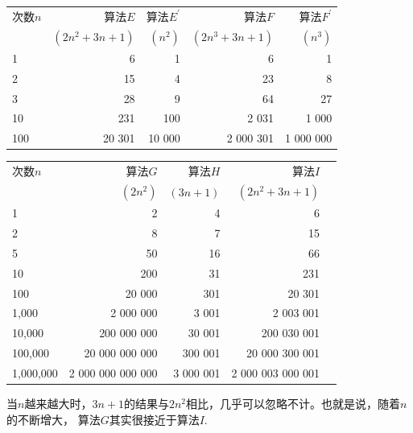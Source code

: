 \begin{frame}
  \begin{table}
    \begin{tabular}{|l|r|r|r|r|}\hline
      次数$n$&算法$E$&算法$E^\prime$&算法$F$&算法$F^\prime$\\
      &$(2n^2+3n+1)$&$(n^2)$&$(2n^3+3n+1)$&$(n^3)$\\
      \hline
      1   &     6&     1&        6&        1\\\hline
      2   &    15&     4&       23&        8\\\hline
      3   &    28&     9&       64&       27\\\hline
      10  &   231&   100&    2 031&    1 000\\\hline
      100 &20 301&10 000&2 000 301&1 000 000\\\hline
    \end{tabular}
  \end{table}

  \pause
      
  

\end{frame}


\begin{frame}
  \begin{table}
    \begin{tabular}{|l|r|r|r|r|}\hline
      次数$n$&算法$G$&算法$H$&算法$I$\\
            &$(2n^2)$&$(3n+1)$&$(2n^2+3n+1)$\\
      \hline
      1        &                2&        4&                 6\\\hline
      2        &                8&        7&                15\\\hline
      5        &               50&       16&                66\\\hline
      10       &              200&       31&               231\\\hline
      100      &           20 000&      301&            20 301\\\hline
      1,000    &        2 000 000&    3 001&         2 003 001\\\hline
      10,000   &      200 000 000&   30 001&       200 030 001\\\hline
      100,000  &   20 000 000 000&  300 001&    20 000 300 001\\\hline
      1,000,000&2 000 000 000 000&3 000 001& 2 000 003 000 001\\\hline
    \end{tabular}
  \end{table}
  \pause
  \begin{zhu}
    当$n$越来越大时，$3n+1$的结果与$2n^2$相比，几乎可以忽略不计。也就是说，随着$n$的不断增大，
    算法$G$其实很接近于算法$I$.
  \end{zhu}

\end{frame}


